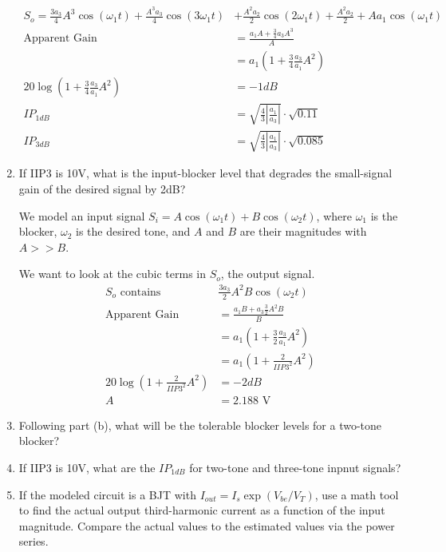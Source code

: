 \begin{enumerate}[label=(\alph*)]
    \begin{align*}
        S_o = \frac{3 a_{3}}{4} A^{3} \cos{\left (\omega_1 t \right )} + \frac{A^{3} a_{3}}{4} \cos{\left (3 \omega_1 t \right )} &+ \frac{A^{2} a_{2}}{2} \cos{\left (2 \omega_1 t \right )} + \frac{A^{2} a_{2}}{2} + A a_{1} \cos{\left (\omega_1 t \right )} \\
        \text{Apparent Gain} &= \frac{a_1 A + \frac{3}{4} a_3 A^3}{A} \\
        &= a_1 (1 + \frac{3}{4} \frac{a_3}{a_1} A^2) \\
        20 \log(1 + \frac{3}{4} \frac{a_3}{a_1} A^2) &= -1 dB \\
        IP_{1dB} &= \sqrt{\frac{4}{3} |\frac{a_1}{a_3}|} \cdot \sqrt{0.11} \\
        IP_{3dB} &= \sqrt{\frac{4}{3} |\frac{a_1}{a_3}|} \cdot \sqrt{0.085}
    \end{align*}

    \item {\color{blue} If IIP3 is 10V, what is the input-blocker level that degrades the small-signal gain of the desired signal by 2dB?}

    We model an input signal $S_i = A \cos{\left (\omega_1 t \right )} + B \cos{\left (\omega_2 t \right )}$, where $\omega_1$ is the blocker, $\omega_2$ is the desired tone, and $A$ and $B$ are their magnitudes with $A >> B$.

    We want to look at the cubic terms in $S_o$, the output signal.
    \begin{align*}
        S_o \text{ contains }& \frac{3 a_{3}}{2} A^{2} B \cos{\left (\omega_2 t \right )} \\
        \text{Apparent Gain} &= \frac{a_1 B + a_3 \frac{3}{2} A^2 B}{B} \\
        &= a_1 (1 + \frac{3}{2} \frac{a_3}{a_1} A^2) \\
        &= a_1 (1 + \frac{2}{IIP3^2} A^2) \\
        20 \log(1 + \frac{2}{IIP3^2} A^2) &= -2 dB \\
        A &= 2.188 \text{ V}
    \end{align*}

    \item {\color{blue} Following part (b), what will be the tolerable blocker levels for a two-tone blocker?}

    \item {\color{blue} If IIP3 is 10V, what are the $IP_{1dB}$ for two-tone and three-tone inpnut signals?}

    \item {\color{blue} If the modeled circuit is a BJT with $I_{out} = I_s \exp(V_{be}/V_{T})$, use a math tool to find the actual output third-harmonic current as a function of the input magnitude. Compare the actual values to the estimated values via the power series.}
\end{enumerate}

